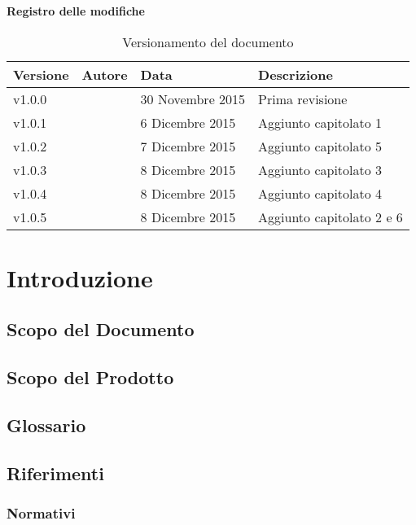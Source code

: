 \documentclass[12pt,a4paper]{article}
\begin{document}
\Large{\textbf{Registro delle modifiche}}\\
\normalsize

\begin{table}[h]
\begin{center}

\begin{tabular}{p{} p{} p{} p{}}
\toprule
\textbf{Versione}	&	\textbf{Autore}	&	\textbf{Data}	&	\textbf{Descrizione}\\
\midrule
\midrule
v1.0.0	&	\NDC	&	30 Novembre 2015 	&	Prima revisione\\
\midrule
v1.0.1	&	\TP	&	6 Dicembre 2015	&	Aggiunto capitolato 1\\
\midrule
v1.0.2	&	\TP	&	7 Dicembre 2015	&	Aggiunto capitolato 5\\
\midrule
v1.0.3	&	\IB	&	8 Dicembre 2015	&	Aggiunto capitolato 3\\
\midrule
v1.0.4	&	\IB	&	8 Dicembre 2015	&	Aggiunto capitolato 4\\
\midrule
v1.0.5	&	\AVE	&	8 Dicembre 2015	&	Aggiunto capitolato 2 e 6\\
\bottomrule
\end{tabular}
\caption{Versionamento del documento}
\label{tabVers1}
\end{center}
\end{table}
\newpage

\tableofcontents
\newpage

\section{Introduzione}
\subsection{Scopo del Documento}
\subsection{Scopo del Prodotto}
\subsection{Glossario}
\subsection{Riferimenti}
\subsubsection{Normativi}
\end{document}

